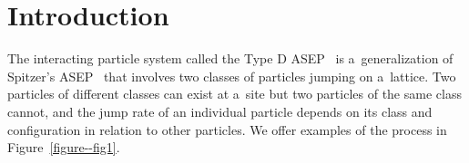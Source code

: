 \documentclass[pdftex]{sigma}
\numberwithin{equation}{section}
\theoremstyle{definition}
\begin{document}


\section{Introduction} \label{section--Intro}

The interacting particle system called the Type D ASEP~\cite{kuan2020interactingparticlesystemstype} is a~generalization of Spitzer's ASEP~\cite{SPITZER1970246} that involves two classes of particles jumping on a~lattice. Two particles of different classes can exist at a~site but two particles of the same class cannot, and the jump rate of an individual particle depends on its class and configuration in relation to other particles. We offer examples of the process in Figure~\ref{figure--fig1}.
\end{document}
